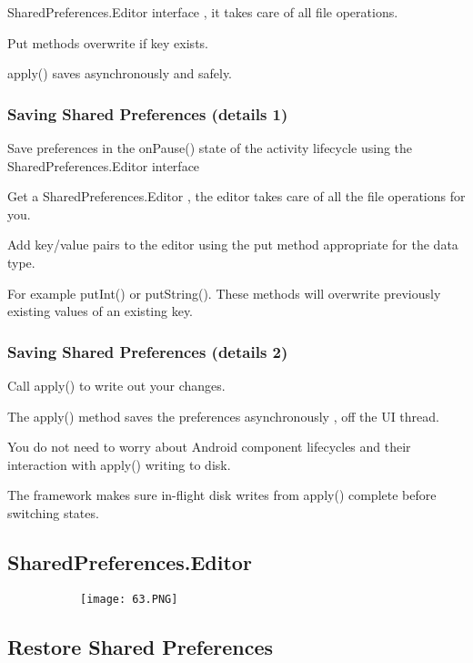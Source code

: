 \documentclass{article}
\begin{document}
SharedPreferences.Editor interface , it takes care of all file operations.

Put methods overwrite if key exists.

apply() saves asynchronously and safely.

\subsubsection{Saving Shared Preferences (details 1)}

Save preferences in the onPause() state of the activity lifecycle using the SharedPreferences.Editor interface

Get a SharedPreferences.Editor , the editor takes care of all the file operations for you.

Add key/value pairs to the editor using the put method appropriate for the data type.

For example putInt() or putString(). These methods will overwrite previously existing values of an existing key.

\subsubsection{Saving Shared Preferences (details 2)}

Call apply() to write out your changes.

The apply() method saves the preferences asynchronously , off the UI thread.

You do not need to worry about Android component lifecycles and their interaction with apply() writing to disk.

The framework makes sure in-flight disk writes from apply() complete before switching states.


\subsection{SharedPreferences.Editor}


      \begin{figure}[ht!]
  \centering
  \begin{subfigure}[b]{0.8\linewidth}
  \texttt{[image: 63.PNG]}
  \end{subfigure}
  \end{figure}

\subsection{Restore Shared Preferences}
\end{document}
